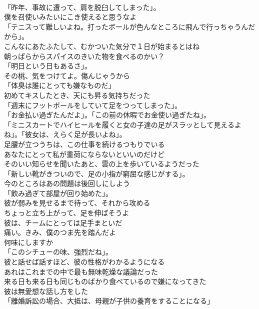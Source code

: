 \documentclass[8pt]{extreport}
\begin{document}
\begin{CJK}{UTF8}{min}
\\	「昨年、事故に遭って、肩を脱臼してしまった」。	
\\	僕を召使いみたいにこき使えると思うなよ	
\\	「テニスって難しいよね。打ったボールが色んなところに飛んで行っちゃうんだから」。	
\\	こんなにあたふたして、むかついた気分で１日が始まるとはね	
\\	朝っぱらからスパイスのきいた物を食べるのかい？	
\\	「明日という日もあるさ」。	
\\	その桃、気をつけてよ。傷んじゃうから	
\\	「体臭は誰にとっても嫌なものだ」	
\\	初めてキスしたとき、天にも昇る気持ちだった	
\\	「週末にフットボールをしていて足をつってしまった」。	
\\	「お金払い過ぎたんだよ」。「この前の休暇でお金使い過ぎたね」。	
\\	「ミニスカートでハイヒールを履くと女の子達の足がスラッとして見えるよね」。「彼女は、えらく足が長いよね」。	
\\	足腰が立つうちは、この仕事を続けるつもりでいる	
\\	あなたにとって私が重荷にならないといいのだけど	
\\	そのいい知らせを聞いたあと、雲の上を歩いているようだった	
\\	「新しい靴がきついので、足の小指が窮屈な感じがする」。	
\\	今のところはあの問題は後回しにしよう	
\\	「飲み過ぎて部屋が回り始めた」。	
\\	彼が弱みを見せるまで待って、それから攻める	
\\	ちょっと立ち上がって、足を伸ばそうよ	
\\	彼は、チームにとっては足手まといだ	
\\	痛い。きみ、僕のつま先を踏んだよ	
\\	何味にしますか	
\\	「このシチューの味、強烈だね」。	
\\	彼と話せば話すほど、彼の性格がわかるようになる	
\\	あれはこれまでの中で最も無味乾燥な議論だった	
\\	来る日も来る日も同じものばかり食べているので嫌になってきた	
\\	彼は無愛想な話し方をした	
\\	「離婚訴訟の場合、大抵は、母親が子供の養育をすることになる」	

\end{CJK}
\end{document}
